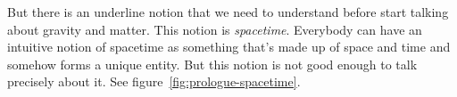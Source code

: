 But there is an underline notion that we need to understand before start talking about gravity
and matter. This notion is \emph{spacetime}. Everybody can have an intuitive notion of spacetime
as something that's made up of space and time and somehow forms a unique entity. But this notion
is not good enough to talk precisely about it. See figure~\ref{fig:prologue-spacetime}.
\begin{figure}[ht]
  \centering
  \def\scl{1}
  \pgfmathsetmacro{\XLENGRAVITY}{\XLENMATTER}
  \pgfmathsetmacro{\YLENGRAVITY}{\YLENMATTER}
  \pgfmathsetmacro{\XLENSPACETIME}{\XLENMATTER + \XLEN + \XLENGRAVITY}
  \pgfmathsetmacro{\YLENSPACETIME}{\YLENMATTER}
  \pgfmathsetmacro{\XSEND}{\XSINI + \XLENSPACETIME}
  \pgfmathsetmacro{\YSEND}{\YSINI + \YLENSPACETIME}
  \pgfmathsetmacro{\XMINI}{\XSINI}
  \pgfmathsetmacro{\YMINI}{\YSINI + \YLENSPACETIME + \YLEN}
  \pgfmathsetmacro{\XMEND}{\XMINI + \XLENMATTER}
  \pgfmathsetmacro{\YMEND}{\YMINI + \YLENMATTER}
  \pgfmathsetmacro{\XGINI}{\XMEND + \XLEN}
  \pgfmathsetmacro{\YGINI}{\YMINI}
  \pgfmathsetmacro{\XGEND}{\XGINI + \XLENGRAVITY}
  \pgfmathsetmacro{\YGEND}{\YGINI + \YLENGRAVITY}
  \pgfmathsetmacro{\XARROWINI}{\XMTEXT}
  \pgfmathsetmacro{\YARROWINI}{\YMEND}
  \pgfmathsetmacro{\XARROWEND}{\XGTEXT}
  \pgfmathsetmacro{\YARROWEND}{\YGEND}


\end{figure}

